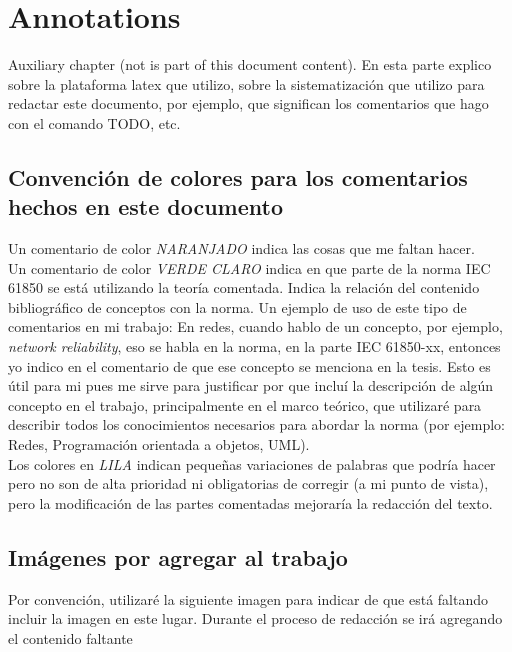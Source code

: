 \chapter*{Annotations}

Auxiliary chapter (not is part of this document content).
En esta parte explico sobre la plataforma latex que utilizo, sobre la
sistematizaci\'on que utilizo para redactar este documento, por ejemplo, que
significan los comentarios que hago con el comando TODO, etc.

\section{Convenci\'on de colores para los comentarios hechos en este documento}
	Un comentario de color 
	\emph{NARANJADO}
	indica las cosas que me faltan hacer.\\

	Un comentario de color 
	\emph{VERDE CLARO}
	indica en que parte de la norma IEC 61850 se est\'a utilizando la teor\'ia
	comentada. Indica la relaci\'on del contenido bibliogr\'afico de conceptos con
	la norma. 
	Un ejemplo de uso de este tipo de comentarios en mi trabajo:
	En redes, cuando hablo de un concepto, por ejemplo, \emph{network
	reliability}, eso se habla en la norma, en la parte IEC 61850-xx, entonces yo
	indico en el comentario de que ese concepto se menciona en la tesis. 
	Esto es \'util para mi pues me sirve para justificar por que inclu\'i la 
	descripci\'on de alg\'un concepto en el trabajo, principalmente en el marco
	te\'orico, que utilizar\'e para describir todos los conocimientos necesarios
	para abordar la norma (por ejemplo: Redes, Programaci\'on orientada a
	objetos, UML).\\
	
	Los colores en \emph{LILA}
	indican peque\~nas variaciones de palabras que podr\'ia hacer pero no son de
	alta prioridad ni obligatorias de corregir (a mi punto de vista), pero
	la modificaci\'on de las partes comentadas mejorar\'ia la redacci\'on del
	texto.
	

\section{Im\'agenes por agregar al trabajo}
	Por convenci\'on, utilizar\'e la siguiente imagen
	para indicar de que est\'a faltando incluir la imagen en este lugar. Durante
	el proceso de redacci\'on se ir\'a agregando el contenido faltante




\listoftodos

	